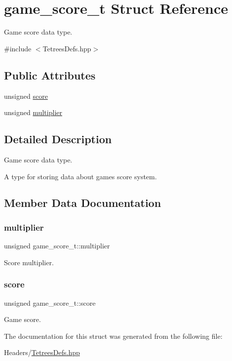 \hypertarget{structgame__score__t}{}\section{game\+\_\+score\+\_\+t Struct Reference}
\label{structgame__score__t}


Game score data type.  




{\ttfamily \#include $<$Tetrees\+Defs.\+hpp$>$}

\subsection*{Public Attributes}
\begin{DoxyCompactItemize}
\item 
unsigned \hyperlink{structgame__score__t_ad31c74c891223f5649797cbd13a86de8}{score}
\item 
unsigned \hyperlink{structgame__score__t_a9dbd70f0cf1f4258895ff90db228297d}{multiplier}
\end{DoxyCompactItemize}


\subsection{Detailed Description}
Game score data type. 

A type for storing data about game\textquotesingle{}s score system. 

\subsection{Member Data Documentation}
\mbox{\label{structgame__score__t_a9dbd70f0cf1f4258895ff90db228297d}} 
\subsubsection{\texorpdfstring{multiplier}{multiplier}}
{\footnotesize\ttfamily unsigned game\+\_\+score\+\_\+t\+::multiplier}

Score multiplier. \mbox{\label{structgame__score__t_ad31c74c891223f5649797cbd13a86de8}} 
\subsubsection{\texorpdfstring{score}{score}}
{\footnotesize\ttfamily unsigned game\+\_\+score\+\_\+t\+::score}

Game score. 

The documentation for this struct was generated from the following file\+:\begin{DoxyCompactItemize}
\item 
Headers/\hyperlink{TetreesDefs_8hpp}{Tetrees\+Defs.\+hpp}\end{DoxyCompactItemize}
